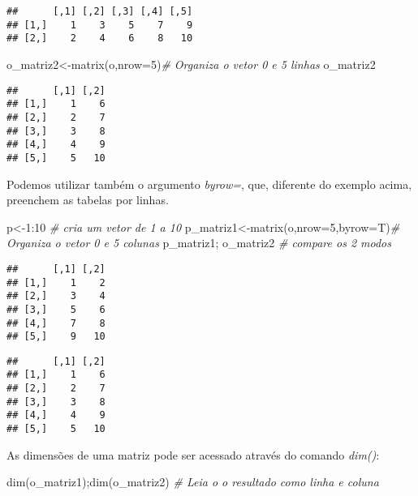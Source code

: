 \documentclass[
]{book}
\newenvironment{Shaded}{\begin{snugshade}}{\end{snugshade}}
\newcommand{\AttributeTok}[1]{\textcolor[rgb]{0.77,0.63,0.00}{#1}}
\newcommand{\CommentTok}[1]{\textcolor[rgb]{0.56,0.35,0.01}{\textit{#1}}}
\newcommand{\DecValTok}[1]{\textcolor[rgb]{0.00,0.00,0.81}{#1}}
\newcommand{\FunctionTok}[1]{\textcolor[rgb]{0.00,0.00,0.00}{#1}}
\newcommand{\NormalTok}[1]{#1}
\newcommand{\OtherTok}[1]{\textcolor[rgb]{0.56,0.35,0.01}{#1}}
\newcommand{\SpecialCharTok}[1]{\textcolor[rgb]{0.00,0.00,0.00}{#1}}
\begin{document}
\begin{verbatim}
##      [,1] [,2] [,3] [,4] [,5]
## [1,]    1    3    5    7    9
## [2,]    2    4    6    8   10
\end{verbatim}

\begin{Shaded}
\begin{Highlighting}[]
\NormalTok{o\_matriz2}\OtherTok{\textless{}{-}}\FunctionTok{matrix}\NormalTok{(o,}\AttributeTok{nrow=}\DecValTok{5}\NormalTok{)}\CommentTok{\# Organiza o vetor 0 e 5 linhas}
\NormalTok{o\_matriz2}
\end{Highlighting}
\end{Shaded}

\begin{verbatim}
##      [,1] [,2]
## [1,]    1    6
## [2,]    2    7
## [3,]    3    8
## [4,]    4    9
## [5,]    5   10
\end{verbatim}

Podemos utilizar também o argumento \emph{byrow=}, que, diferente do exemplo acima, preenchem as tabelas por linhas.

\begin{Shaded}
\begin{Highlighting}[]
\NormalTok{p}\OtherTok{\textless{}{-}}\DecValTok{1}\SpecialCharTok{:}\DecValTok{10} \CommentTok{\# cria um vetor de 1 a 10}
\NormalTok{p\_matriz1}\OtherTok{\textless{}{-}}\FunctionTok{matrix}\NormalTok{(o,}\AttributeTok{nrow=}\DecValTok{5}\NormalTok{,}\AttributeTok{byrow=}\NormalTok{T)}\CommentTok{\# Organiza o vetor 0 e 5 colunas}
\NormalTok{p\_matriz1; o\_matriz2 }\CommentTok{\# compare os 2 modos}
\end{Highlighting}
\end{Shaded}

\begin{verbatim}
##      [,1] [,2]
## [1,]    1    2
## [2,]    3    4
## [3,]    5    6
## [4,]    7    8
## [5,]    9   10
\end{verbatim}

\begin{verbatim}
##      [,1] [,2]
## [1,]    1    6
## [2,]    2    7
## [3,]    3    8
## [4,]    4    9
## [5,]    5   10
\end{verbatim}

As dimensões de uma matriz pode ser acessado através do comando \emph{dim()}:

\begin{Shaded}
\begin{Highlighting}[]
\FunctionTok{dim}\NormalTok{(o\_matriz1);}\FunctionTok{dim}\NormalTok{(o\_matriz2) }\CommentTok{\# Leia o o resultado como linha e coluna}
\end{Highlighting}
\end{Shaded}
\end{document}
